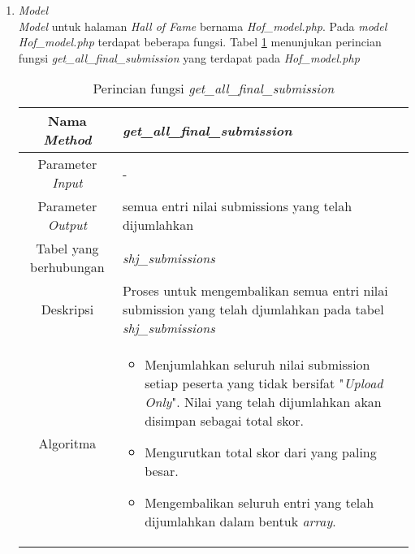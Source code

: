 \begin{enumerate}
	\item \textit{Model} \\
	\textit{Model} untuk halaman \textit{Hall of Fame} bernama \textit{Hof\_model.php}. Pada \textit{model Hof\_model.php} terdapat beberapa fungsi. Tabel \ref{tab:f1hof} menunjukan perincian fungsi \textit{get\_all\_final\_submission} yang terdapat pada \textit{Hof\_model.php}
	\begin{table}[H]
		\caption{Perincian fungsi \textit{get\_all\_final\_submission}}
		\label{tab:f1hof}
		\begin{tabular}{|c|p{11cm}|}
			\hline
			Nama \textit{Method} 	& 	\textit{get\_all\_final\_submission} 	\\
			\hline
			Parameter \textit{Input} & - \\
			\hline
			Parameter \textit{Output} & semua entri nilai submissions yang telah dijumlahkan \\
			\hline
			Tabel yang berhubungan & \textit{shj\_submissions} \\
			\hline
			Deskripsi	& Proses untuk mengembalikan semua entri nilai submission yang telah djumlahkan pada tabel \textit{shj\_submissions} \\
			\hline
			Algoritma	& \begin{itemize}
				\item Menjumlahkan seluruh nilai submission setiap peserta yang tidak bersifat "\textit{Upload Only}". Nilai yang telah dijumlahkan akan disimpan sebagai total skor.
				\item Mengurutkan total skor dari yang paling besar.
				\item Mengembalikan seluruh entri yang telah dijumlahkan dalam bentuk \textit{array}.
			\end{itemize} \\
			\hline
		\end{tabular}
	\end{table}
	

\end{enumerate}
